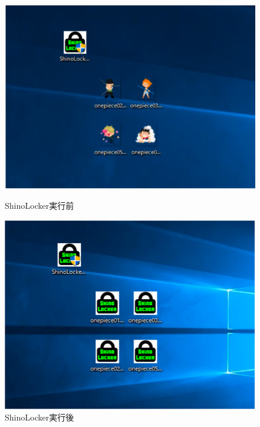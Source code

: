 \documentclass[dvipdfmx,autodetect-engine]{jsarticle}
\begin{document}
\begin{figure}[H]
  \centering
  \begin{minipage}[b]{0.45\linewidth}
  \begin{center}
    \includegraphics[keepaspectratio,scale=0.6]{pic2.png}
    \end{center}
    \caption{ShinoLocker実行前}
  \end{minipage}
  \begin{minipage}[b]{0.45\linewidth}
  \begin{center}
    \includegraphics[keepaspectratio,scale=0.6]{pic3.png}
    \end{center}
    \caption{ShinoLocker実行後}
  \end{minipage}
\end{figure}
\end{document}
